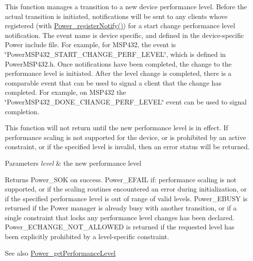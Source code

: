 This function manages a transition to a new device performance level. Before the actual transition is initiated, notifications will be sent to any clients who\textquotesingle{}ve registered (with \hyperlink{_power_8h_a8e73c431e3d1aab1a31181513ceb8adb}{Power\+\_\+register\+Notify()}) for a \textquotesingle{}start change performance level\textquotesingle{} notification. The event name is device specific, and defined in the device-\/specific Power include file. For example, for M\+S\+P432, the event is \char`\"{}\+Power\+M\+S\+P432\+\_\+\+S\+T\+A\+R\+T\+\_\+\+C\+H\+A\+N\+G\+E\+\_\+\+P\+E\+R\+F\+\_\+\+L\+E\+V\+E\+L\char`\"{}, which is defined in Power\+M\+S\+P432.\+h. Once notifications have been completed, the change to the performance level is initiated. After the level change is completed, there is a comparable event that can be used to signal a client that the change has completed. For example, on M\+S\+P432 the \char`\"{}\+Power\+M\+S\+P432\+\_\+\+D\+O\+N\+E\+\_\+\+C\+H\+A\+N\+G\+E\+\_\+\+P\+E\+R\+F\+\_\+\+L\+E\+V\+E\+L\char`\"{} event can be used to signal completion.

This function will not return until the new performance level is in effect. If performance scaling is not supported for the device, or is prohibited by an active constraint, or if the specified level is invalid, then an error status will be returned.


\begin{DoxyParams}{Parameters}
{\em level} & the new performance level\\
\hline
\end{DoxyParams}
\begin{DoxyReturn}{Returns}
Power\+\_\+\+S\+O\+K on success. Power\+\_\+\+E\+F\+A\+I\+L if\+: performance scaling is not supported, or if the scaling routines encountered an error during initialization, or if the specified performance level is out of range of valid levels. Power\+\_\+\+E\+B\+U\+S\+Y is returned if the Power manager is already busy with another transition, or if a single constraint that locks any performance level changes has been declared. Power\+\_\+\+E\+C\+H\+A\+N\+G\+E\+\_\+\+N\+O\+T\+\_\+\+A\+L\+L\+O\+W\+E\+D is returned if the requested level has been explicitly prohibited by a level-\/specific constraint.
\end{DoxyReturn}
\begin{DoxySeeAlso}{See also}
\hyperlink{_power_8h_a992dabafbcd2ed75308dd3e166d9e658}{Power\+\_\+get\+Performance\+Level} 
\end{DoxySeeAlso}
